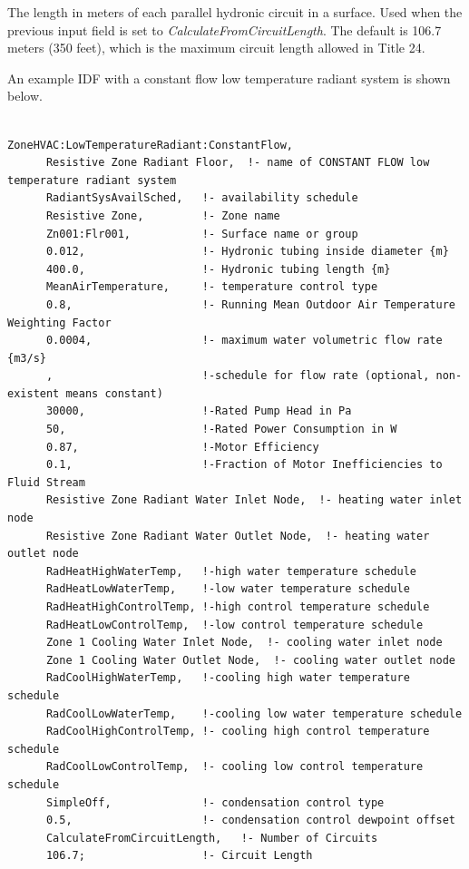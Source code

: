 The length in meters of each parallel hydronic circuit in a surface. Used when the previous input field is set to \emph{CalculateFromCircuitLength}. The default is 106.7 meters (350 feet), which is the maximum circuit length allowed in Title 24.

An example IDF with a constant flow low temperature radiant system is shown below.

\begin{lstlisting}

ZoneHVAC:LowTemperatureRadiant:ConstantFlow,
      Resistive Zone Radiant Floor,  !- name of CONSTANT FLOW low temperature radiant system
      RadiantSysAvailSched,   !- availability schedule
      Resistive Zone,         !- Zone name
      Zn001:Flr001,           !- Surface name or group
      0.012,                  !- Hydronic tubing inside diameter {m}
      400.0,                  !- Hydronic tubing length {m}
      MeanAirTemperature,     !- temperature control type
      0.8,                    !- Running Mean Outdoor Air Temperature Weighting Factor
      0.0004,                 !- maximum water volumetric flow rate {m3/s}
      ,                       !-schedule for flow rate (optional, non-existent means constant)
      30000,                  !-Rated Pump Head in Pa
      50,                     !-Rated Power Consumption in W
      0.87,                   !-Motor Efficiency
      0.1,                    !-Fraction of Motor Inefficiencies to Fluid Stream
      Resistive Zone Radiant Water Inlet Node,  !- heating water inlet node
      Resistive Zone Radiant Water Outlet Node,  !- heating water outlet node
      RadHeatHighWaterTemp,   !-high water temperature schedule
      RadHeatLowWaterTemp,    !-low water temperature schedule
      RadHeatHighControlTemp, !-high control temperature schedule
      RadHeatLowControlTemp,  !-low control temperature schedule
      Zone 1 Cooling Water Inlet Node,  !- cooling water inlet node
      Zone 1 Cooling Water Outlet Node,  !- cooling water outlet node
      RadCoolHighWaterTemp,   !-cooling high water temperature schedule
      RadCoolLowWaterTemp,    !-cooling low water temperature schedule
      RadCoolHighControlTemp, !- cooling high control temperature schedule
      RadCoolLowControlTemp,  !- cooling low control temperature schedule
      SimpleOff,              !- condensation control type
      0.5,                    !- condensation control dewpoint offset
      CalculateFromCircuitLength,   !- Number of Circuits
      106.7;                  !- Circuit Length
\end{lstlisting}

